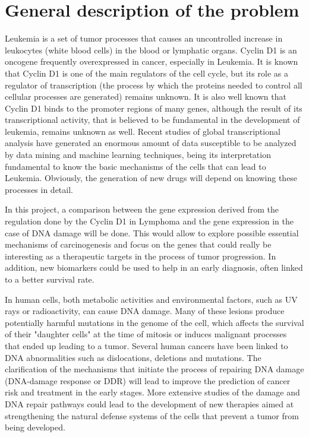 
\section{General description of the problem}

Leukemia is a set of tumor processes that causes an uncontrolled increase in leukocytes (white blood cells) in the blood or lymphatic organs. Cyclin D1 is an oncogene frequently overexpressed in cancer, especially in Leukemia.
It is known that Cyclin D1 is one of the main regulators of the cell cycle, but its role as a regulator of transcription (the process by which the proteins needed to control all cellular processes are generated) remains unknown.
It is also well known that Cyclin D1 binds to the promoter regions of many genes, although the result of its transcriptional activity, that is believed to be fundamental in the development of leukemia, remains unknown as well.
Recent studies of global transcriptional analysis have generated an enormous amount of data susceptible to be analyzed by data mining and machine learning techniques, being its interpretation fundamental to know the basic mechanisms of the cells that can lead to Leukemia.
Obviously, the generation of new drugs will depend on knowing these processes in detail.

In this project, a comparison between the gene expression derived from the regulation done by the Cyclin D1 in Lymphoma and the gene expression in the case of DNA damage will be done. This would allow to explore possible essential mechanisms of carcinogenesis and focus on the genes that could really be interesting as a therapeutic targets in the process of tumor progression. In addition, new biomarkers could be used to help in an early diagnosis, often linked to a better survival rate.

In human cells, both metabolic activities and environmental factors, such as UV rays or radioactivity, can cause DNA damage. Many of these lesions produce potentially harmful mutations in the genome of the cell, which affects the survival of their "daughter cells" at the time of mitosis or induces malignant processes that ended up leading to a tumor. Several human cancers have been linked to DNA abnormalities such as dislocations, deletions and mutations. The clarification of the mechanisms that initiate the process of repairing DNA damage (DNA-damage response or DDR) will lead to improve the prediction of cancer risk and treatment in the early stages. More extensive studies of the damage and DNA repair pathways could lead to the development of new therapies aimed at strengthening the natural defense systems of the cells that prevent a tumor from being developed.

